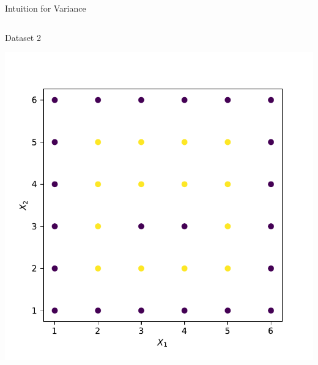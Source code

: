 \documentclass[aspectratio=169,10pt]{beamer}
\newcommand{\fitpic}[1]{\begin{adjustbox}{max width=\linewidth, max totalheight=0.78\textheight}#1\end{adjustbox}}
\begin{document}
\begin{frame}{Intuition for Variance}
\begin{columns}
\begin{column}{0.5\textwidth}{\hspace{1.75cm} Dataset 2}
\begin{center}
			\fitpic{\includegraphics[width = \textwidth]{dataset-2-train-var}}
			\end{center}
		\end{column}
	\end{columns}
	\end{frame}
\end{document}

